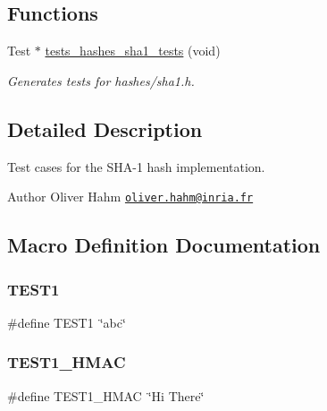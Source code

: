 \subsection*{Functions}
\begin{DoxyCompactItemize}
\item 
Test $\ast$ \hyperlink{group__unittests_ga5567d66422cdc40775eeacf6fa796893}{tests\+\_\+hashes\+\_\+sha1\+\_\+tests} (void)
\begin{DoxyCompactList}\small\item\em Generates tests for hashes/sha1.\+h. \end{DoxyCompactList}\end{DoxyCompactItemize}


\subsection{Detailed Description}
Test cases for the S\+H\+A-\/1 hash implementation. 

\begin{DoxyAuthor}{Author}
Oliver Hahm \href{mailto:oliver.hahm@inria.fr}{\tt oliver.\+hahm@inria.\+fr} 
\end{DoxyAuthor}


\subsection{Macro Definition Documentation}
\mbox{\label{tests-hashes-sha1_8c_aef8471770769d5643c8d0e9d49de0678}} 
\subsubsection{\texorpdfstring{T\+E\+S\+T1}{TEST1}}
{\footnotesize\ttfamily \#define T\+E\+S\+T1~\char`\"{}abc\char`\"{}}

\mbox{\label{tests-hashes-sha1_8c_a64adb2d5a7abb689ffacaef002f48f72}} 
\subsubsection{\texorpdfstring{T\+E\+S\+T1\+\_\+\+H\+M\+AC}{TEST1\_HMAC}}
{\footnotesize\ttfamily \#define T\+E\+S\+T1\+\_\+\+H\+M\+AC~\char`\"{}Hi There\char`\"{}}

